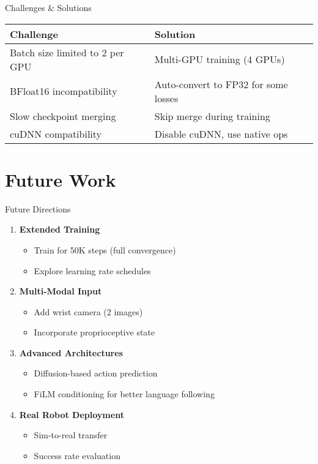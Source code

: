 \documentclass[aspectratio=169]{beamer}
\begin{document}
\begin{frame}{Challenges \& Solutions}
\begin{table}
\small
\begin{tabular}{p{}p{}}
\toprule
\textbf{Challenge} & \textbf{Solution} \\
\midrule
Batch size limited to 2 per GPU & Multi-GPU training (4 GPUs) \\
BFloat16 incompatibility & Auto-convert to FP32 for some losses \\
Slow checkpoint merging & Skip merge during training \\
cuDNN compatibility & Disable cuDNN, use native ops \\
\bottomrule
\end{tabular}
\end{table}
\end{frame}

\section{Future Work}

\begin{frame}{Future Directions}
\begin{enumerate}
    \item \textbf{Extended Training}
    \begin{itemize}
        \item Train for 50K steps (full convergence)
        \item Explore learning rate schedules
    \end{itemize}
    
    \item \textbf{Multi-Modal Input}
    \begin{itemize}
        \item Add wrist camera (2 images)
        \item Incorporate proprioceptive state
    \end{itemize}
    
    \item \textbf{Advanced Architectures}
    \begin{itemize}
        \item Diffusion-based action prediction
        \item FiLM conditioning for better language following
    \end{itemize}
    
    \item \textbf{Real Robot Deployment}
    \begin{itemize}
        \item Sim-to-real transfer
        \item Success rate evaluation
    \end{itemize}
\end{enumerate}
\end{frame}
\end{document}

